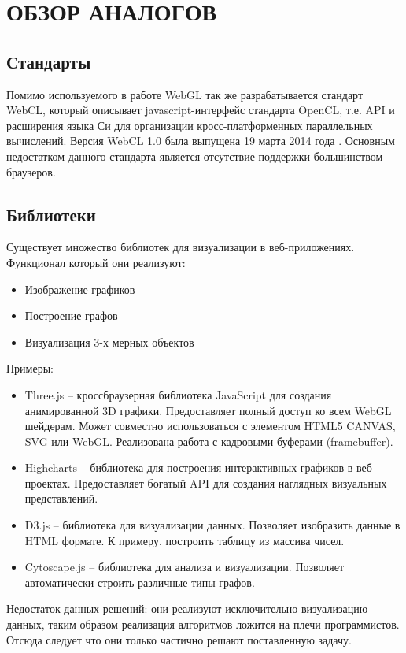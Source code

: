\newpage
\section{ОБЗОР АНАЛОГОВ}

\subsection{Стандарты}

Помимо используемого в работе WebGL так же разрабатывается стандарт WebCL, который описывает 
javascript-интерфейс стандарта OpenCL, т.е. API и расширения языка Си для организации
кросс-платформенных параллельных вычислений. Версия WebCL 1.0 была выпущена 19 марта 2014 года \cite{webcl10}.
Основным недостатком данного стандарта является отсутствие поддержки большинством браузеров.

\subsection{Библиотеки}
Существует множество библиотек для визуализации в веб-приложениях. Функционал который они реализуют:
\begin{itemize}
  \item Изображение графиков
  \item Построение графов
  \item Визуализация 3-х мерных объектов
\end{itemize}

Примеры:
\begin{itemize}
  \item Three.js -- кроссбраузерная библиотека JavaScript для создания анимированной 3D графики.
    Предоставляет полный доступ ко всем WebGL шейдерам. Может совместно использоваться с элементом
    HTML5 CANVAS, SVG или WebGL. Реализована работа с кадровыми буферами (framebuffer).

  \item Highcharts -- библиотека для построения интерактивных графиков в веб-проектах. Предоставляет
    богатый API для создания наглядных визуальных представлений.

  \item D3.js -- библиотека для визуализации данных. Позволяет изобразить данные в HTML формате. 
    К примеру, построить таблицу из массива чисел.
    
  \item Cytoscape.js -- библиотека для анализа и визуализации. Позволяет автоматически 
    строить различные типы графов.
\end{itemize}

Недостаток данных решений: они реализуют исключительно визуализацию данных, таким образом реализация
алгоритмов ложится на плечи программистов. Отсюда следует что они только частично решают поставленную
задачу.
